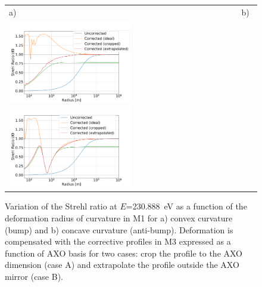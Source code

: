 \documentclass{iucr}
\newcommand{\todo}[1]{{\color{red}[TODO: "#1'']}}
\begin{document}

  \begin{figure}
  \label{fig:strehlRatioVersusR} 
  \begin{center}
  \begin{tabular}{l} 
  a)~~~~~~~~~~~~~~~~~~~~~~~~~~~~~~~~~~~~~~~~~~~~~~~~~~~~~~b) \\
  \includegraphics[width=0.5\textwidth]{figures/scan_peak_vs_negative_radius.pdf}
    \includegraphics[width=0.5\textwidth]{figures/scan_peak_vs_positive_radius.pdf} 
  
  \end{tabular}
  \end{center}
  \caption{
Variation of the Strehl ratio at $E$=230.888~eV as a function of the deformation radius of curvature in M1 for a) convex curvature (bump) and b) concave curvature (anti-bump). Deformation is compensated with the corrective profiles in M3 expressed as a function of AXO basis for two cases: crop the profile to the AXO dimension (case A) and extrapolate the profile outside the AXO mirror (case B).}
  \end{figure} 
\end{document}

